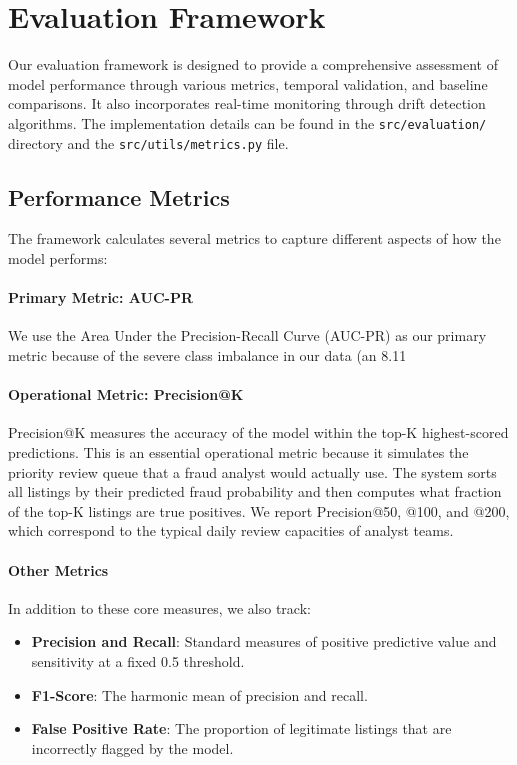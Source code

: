 \section{Evaluation Framework}
\label{sec:4_8}

Our evaluation framework is designed to provide a comprehensive assessment of model performance through various metrics, temporal validation, and baseline comparisons. It also incorporates real-time monitoring through drift detection algorithms. The implementation details can be found in the \texttt{src/evaluation/} directory and the \texttt{src/utils/metrics.py} file.

\subsection{Performance Metrics}
\label{sec:4_8_1}

The framework calculates several metrics to capture different aspects of how the model performs:

\paragraph{Primary Metric: AUC-PR}
We use the Area Under the Precision-Recall Curve (AUC-PR) as our primary metric because of the severe class imbalance in our data (an 8.11%

\paragraph{Operational Metric: Precision@K}
Precision@K measures the accuracy of the model within the top-K highest-scored predictions. This is an essential operational metric because it simulates the priority review queue that a fraud analyst would actually use. The system sorts all listings by their predicted fraud probability and then computes what fraction of the top-K listings are true positives. We report Precision@50, @100, and @200, which correspond to the typical daily review capacities of analyst teams.

\paragraph{Other Metrics}
In addition to these core measures, we also track:
\begin{itemize}
    \item \textbf{Precision and Recall}: Standard measures of positive predictive value and sensitivity at a fixed 0.5 threshold.
    \item \textbf{F1-Score}: The harmonic mean of precision and recall.
    \item \textbf{False Positive Rate}: The proportion of legitimate listings that are incorrectly flagged by the model.
\end{itemize}

